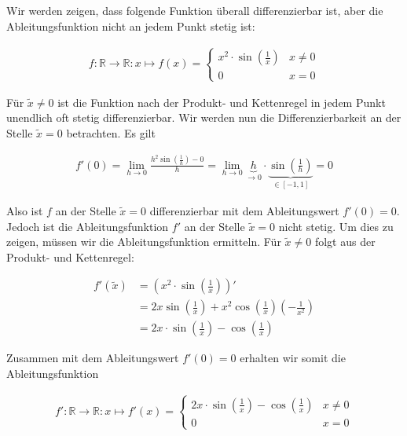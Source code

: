 \documentclass[fontsize=9pt,
               parskip=half-,
               DIV=14,
               listof=chapterentry,
               tocflat]{scrbook}
\begin{document}
\begin{example*}
Wir werden zeigen, dass folgende Funktion überall differenzierbar ist, aber die Ableitungsfunktion nicht an jedem Punkt stetig ist:

\begin{align*}
f:\mathbb {R} \to \mathbb {R} :x\mapsto f(x)={\begin{cases}x^{2}\cdot \sin \left({\frac {1}{x}}\right)&x\neq 0\\0&x=0\end{cases}}
\end{align*}

Für ${\tilde {x}}\neq 0$ ist die Funktion nach der Produkt- und Kettenregel in jedem Punkt unendlich oft stetig differenzierbar. Wir werden nun die Differenzierbarkeit an der Stelle ${\tilde {x}}=0$ betrachten. Es gilt

\begin{align*}
f'(0)=\lim _{h\to 0}{\frac {h^{2}\sin \left({\frac {1}{h}}\right)-0}{h}}=\lim _{h\to 0}\underbrace {h} _{\to 0}\cdot \underbrace {\sin \left({\frac {1}{h}}\right)} _{\in [-1,1]}=0
\end{align*}

Also ist $f$ an der Stelle ${\tilde {x}}=0$ differenzierbar mit dem Ableitungswert $f'(0)=0$. Jedoch ist die Ableitungsfunktion $f'$ an der Stelle ${\tilde {x}}=0$ nicht stetig. Um dies zu zeigen, müssen wir die Ableitungsfunktion ermitteln. Für ${\tilde {x}}\neq 0$ folgt aus der Produkt- und Kettenregel:

\begin{align*}
f'({\tilde {x}})&=\left(x^{2}\cdot \sin \left({\frac {1}{x}}\right)\right)'\\[0.3em]&=2x\sin \left({\frac {1}{x}}\right)+x^{2}\cos \left({\frac {1}{x}}\right)\left(-{\frac {1}{x^{2}}}\right)\\[0.3em]&=2x\cdot \sin \left({\frac {1}{x}}\right)-\cos \left({\frac {1}{x}}\right)
\end{align*}

Zusammen mit dem Ableitungswert $f'(0)=0$ erhalten wir somit die Ableitungsfunktion

\begin{align*}
f':\mathbb {R} \to \mathbb {R} :x\mapsto f'(x)={\begin{cases}2x\cdot \sin \left({\frac {1}{x}}\right)-\cos \left({\frac {1}{x}}\right)&x\neq 0\\0&x=0\end{cases}}
\end{align*}


\end{example*}
\end{document}
